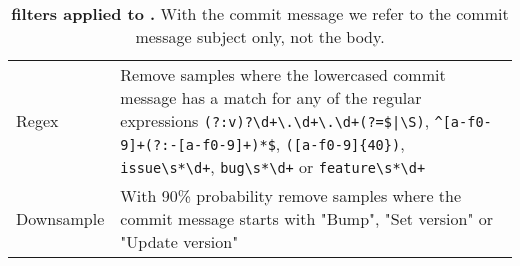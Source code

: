 \begin{table}[htbp]
\begin{tabular}{p{2cm} p{11cm}}
Regex & Remove samples where the lowercased commit message has a match for any of the regular expressions \verb/(?:v)?\d+\.\d+\.\d+(?=$|\S)/,  \verb/^[a-f0-9]+(?:-[a-f0-9]+)*$/, \verb/([a-f0-9]{40})/, \verb/issue\s*\d+/, \verb/bug\s*\d+/ or \verb/feature\s*\d+/ \\
Downsample & With 90\% probability remove samples where the commit message starts with "Bump", "Set version" or "Update version" \\
\bottomrule
\end{tabular}
\caption{\textbf{\dataft{} filters applied to \data{}.} With the commit message we refer to the commit message subject only, not the body.}
\label{tab:filterb}
\end{table}

\begin{table}[htbp]
\centering
\begin{tabular}{p{13cm}}
\toprule

\end{tabular}
\end{table}
